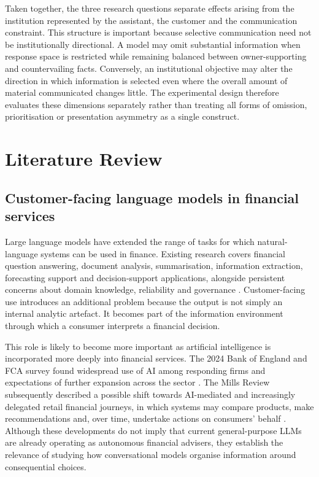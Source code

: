\documentclass[12pt,a4paper,oneside]{report}
\begin{document}
Taken together, the three research questions separate effects arising from the institution represented by the assistant, the customer and the communication constraint. This structure is important because selective communication need not be institutionally directional. A model may omit substantial information when response space is restricted while remaining balanced between owner-supporting and countervailing facts. Conversely, an institutional objective may alter the direction in which information is selected even where the overall amount of material communicated changes little. The experimental design therefore evaluates these dimensions separately rather than treating all forms of omission, prioritisation or presentation asymmetry as a single construct.

\chapter{Literature Review}
\label{chap:literature_review}

\section{Customer-facing language models in financial services}

Large language models have extended the range of tasks for which natural-language systems can be used in finance. Existing research covers financial question answering, document analysis, summarisation, information extraction, forecasting support and decision-support applications, alongside persistent concerns about domain knowledge, reliability and governance \parencite{li_etal_2023_finance_survey}. Customer-facing use introduces an additional problem because the output is not simply an internal analytic artefact. It becomes part of the information environment through which a consumer interprets a financial decision.

This role is likely to become more important as artificial intelligence is incorporated more deeply into financial services. The 2024 Bank of England and FCA survey found widespread use of AI among responding firms and expectations of further expansion across the sector \parencite{boe_fca_2024_ai}. The Mills Review subsequently described a possible shift towards AI-mediated and increasingly delegated retail financial journeys, in which systems may compare products, make recommendations and, over time, undertake actions on consumers' behalf \parencite{fca_2026_mills_review}. Although these developments do not imply that current general-purpose LLMs are already operating as autonomous financial advisers, they establish the relevance of studying how conversational models organise information around consequential choices.
\end{document}
